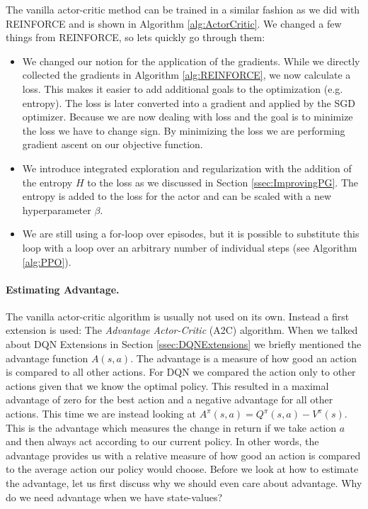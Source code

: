 The vanilla actor-critic method can be trained in a similar fashion as we did with REINFORCE and is shown in Algorithm \ref{alg:ActorCritic}. We changed a few things from REINFORCE, so lets quickly go through them:
\begin{itemize}
  \item We changed our notion for the application of the gradients. While we directly collected the gradients in Algorithm \ref{alg:REINFORCE}, we now calculate a loss. This makes it easier to add additional goals to the optimization (e.g. entropy). The loss is later converted into a gradient and applied by the SGD optimizer. Because we are now dealing with loss and the goal is to minimize the loss we have to change sign. By minimizing the loss we are performing gradient ascent on our objective function.
  \item We introduce integrated exploration and regularization with the addition of the entropy $H$ to the loss as we discussed in Section \ref{ssec:ImprovingPG}. The entropy is added to the loss for the actor and can be scaled with a new hyperparameter $\beta$.
  \item We are still using a for-loop over episodes, but it is possible to substitute this loop with a loop over an arbitrary number of individual steps (see Algorithm \ref{alg:PPO}).   
\end{itemize}

\paragraph{Estimating Advantage.}
The vanilla actor-critic algorithm is usually not used on its own. Instead a first extension is used: The \textit{Advantage Actor-Critic} (A2C) algorithm. When we talked about DQN Extensions in Section \ref{ssec:DQNExtensions} we briefly mentioned the advantage function $A(s, a)$. The advantage is a measure of how good an action is compared to all other actions. For DQN we compared the action only to other actions given that we know the optimal policy. This resulted in a maximal advantage of zero for the best action and a negative advantage for all other actions. This time we are instead looking at $A^\pi(s, a) = Q^\pi(s, a) - V^\pi(s)$. This is the advantage which measures the change in return if we take action $a$ and then always act according to our current policy. In other words, the advantage provides us with a relative measure of how good an action is compared to the average action our policy would choose. Before we look at how to estimate the advantage, let us first discuss why we should even care about advantage. Why do we need advantage when we have state-values?

